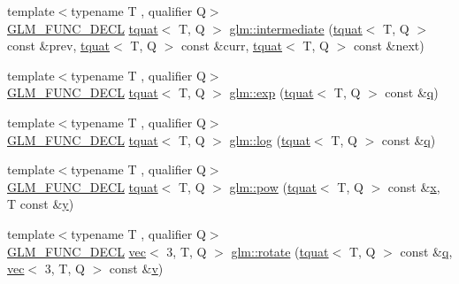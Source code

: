 \begin{DoxyCompactItemize}
\item 
{\footnotesize template$<$typename T , qualifier Q$>$ }\\\mbox{\hyperlink{setup_8hpp_ab2d052de21a70539923e9bcbf6e83a51}{G\+L\+M\+\_\+\+F\+U\+N\+C\+\_\+\+D\+E\+CL}} \mbox{\hyperlink{structglm_1_1tquat}{tquat}}$<$ T, Q $>$ \mbox{\hyperlink{group__gtx__quaternion_gac9be2084562a52ae8923813233563a28}{glm\+::intermediate}} (\mbox{\hyperlink{structglm_1_1tquat}{tquat}}$<$ T, Q $>$ const \&prev, \mbox{\hyperlink{structglm_1_1tquat}{tquat}}$<$ T, Q $>$ const \&curr, \mbox{\hyperlink{structglm_1_1tquat}{tquat}}$<$ T, Q $>$ const \&next)
\item 
{\footnotesize template$<$typename T , qualifier Q$>$ }\\\mbox{\hyperlink{setup_8hpp_ab2d052de21a70539923e9bcbf6e83a51}{G\+L\+M\+\_\+\+F\+U\+N\+C\+\_\+\+D\+E\+CL}} \mbox{\hyperlink{structglm_1_1tquat}{tquat}}$<$ T, Q $>$ \mbox{\hyperlink{group__gtx__quaternion_ga72275e87ce62dc75a06d39a6c049835c}{glm\+::exp}} (\mbox{\hyperlink{structglm_1_1tquat}{tquat}}$<$ T, Q $>$ const \&\mbox{\hyperlink{_s_d_l__opengl_8h_a8fc1e7b9baaae687804c7eed46ca09c6}{q}})
\item 
{\footnotesize template$<$typename T , qualifier Q$>$ }\\\mbox{\hyperlink{setup_8hpp_ab2d052de21a70539923e9bcbf6e83a51}{G\+L\+M\+\_\+\+F\+U\+N\+C\+\_\+\+D\+E\+CL}} \mbox{\hyperlink{structglm_1_1tquat}{tquat}}$<$ T, Q $>$ \mbox{\hyperlink{group__gtx__quaternion_gaad510f1a4ea26994b341c094ec4f4eed}{glm\+::log}} (\mbox{\hyperlink{structglm_1_1tquat}{tquat}}$<$ T, Q $>$ const \&\mbox{\hyperlink{_s_d_l__opengl_8h_a8fc1e7b9baaae687804c7eed46ca09c6}{q}})
\item 
{\footnotesize template$<$typename T , qualifier Q$>$ }\\\mbox{\hyperlink{setup_8hpp_ab2d052de21a70539923e9bcbf6e83a51}{G\+L\+M\+\_\+\+F\+U\+N\+C\+\_\+\+D\+E\+CL}} \mbox{\hyperlink{structglm_1_1tquat}{tquat}}$<$ T, Q $>$ \mbox{\hyperlink{group__gtx__quaternion_gad382fc37392d537aecf2245a4597d8a3}{glm\+::pow}} (\mbox{\hyperlink{structglm_1_1tquat}{tquat}}$<$ T, Q $>$ const \&\mbox{\hyperlink{_s_d_l__opengl_8h_ad0e63d0edcdbd3d79554076bf309fd47}{x}}, T const \&\mbox{\hyperlink{_s_d_l__opengl_8h_a1675d9d7bb68e1657ff028643b4037e3}{y}})
\item 
{\footnotesize template$<$typename T , qualifier Q$>$ }\\\mbox{\hyperlink{setup_8hpp_ab2d052de21a70539923e9bcbf6e83a51}{G\+L\+M\+\_\+\+F\+U\+N\+C\+\_\+\+D\+E\+CL}} \mbox{\hyperlink{structglm_1_1vec}{vec}}$<$ 3, T, Q $>$ \mbox{\hyperlink{group__gtx__quaternion_ga49730f975e7f0ee3862a20b767aba583}{glm\+::rotate}} (\mbox{\hyperlink{structglm_1_1tquat}{tquat}}$<$ T, Q $>$ const \&\mbox{\hyperlink{_s_d_l__opengl_8h_a8fc1e7b9baaae687804c7eed46ca09c6}{q}}, \mbox{\hyperlink{structglm_1_1vec}{vec}}$<$ 3, T, Q $>$ const \&\mbox{\hyperlink{_s_d_l__opengl_8h_a10a82eabcb59d2fcd74acee063775f90}{v}})

\end{DoxyCompactItemize}
